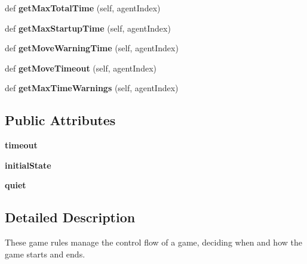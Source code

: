 \begin{DoxyCompactItemize}
def {\bfseries get\+Max\+Total\+Time} (self, agent\+Index)
\item 
\mbox{\label{classpacman_1_1_classic_game_rules_a99d3b445805e45d97f84c99d862db48d}} 
def {\bfseries get\+Max\+Startup\+Time} (self, agent\+Index)
\item 
\mbox{\label{classpacman_1_1_classic_game_rules_a77be77d83c6a3b61e089b1e6c68920f7}} 
def {\bfseries get\+Move\+Warning\+Time} (self, agent\+Index)
\item 
\mbox{\label{classpacman_1_1_classic_game_rules_a37c5dccc853855827a6f0d4904466f4f}} 
def {\bfseries get\+Move\+Timeout} (self, agent\+Index)
\item 
\mbox{\label{classpacman_1_1_classic_game_rules_a7a1d0b0a81c6187c8f5e0bc48c9f85fd}} 
def {\bfseries get\+Max\+Time\+Warnings} (self, agent\+Index)
\end{DoxyCompactItemize}
\subsection*{Public Attributes}
\begin{DoxyCompactItemize}
\item 
\mbox{\label{classpacman_1_1_classic_game_rules_a73cf20483aa9257e177ec3710e2a51f0}} 
{\bfseries timeout}
\item 
\mbox{\label{classpacman_1_1_classic_game_rules_a08305dede6923092ba2ffd280ae86eec}} 
{\bfseries initial\+State}
\item 
\mbox{\label{classpacman_1_1_classic_game_rules_ab66749219a7e83af074ced45d35b6073}} 
{\bfseries quiet}
\end{DoxyCompactItemize}


\subsection{Detailed Description}
\begin{DoxyVerb}These game rules manage the control flow of a game, deciding when
and how the game starts and ends.
\end{DoxyVerb}
 


